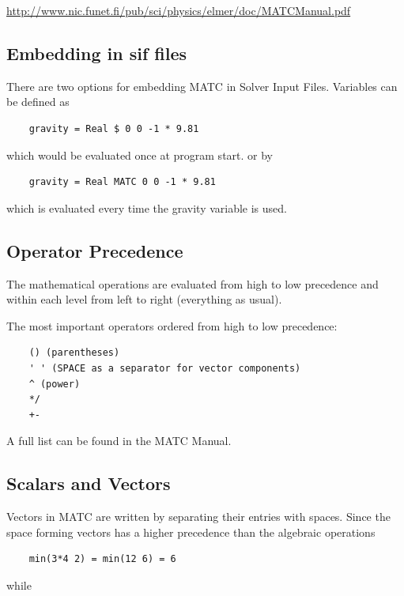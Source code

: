 \url{http://www.nic.funet.fi/pub/sci/physics/elmer/doc/MATCManual.pdf}

\subsection{Embedding in sif files}

There are two options for embedding MATC in Solver Input Files. Variables can be defined as

\begin{verbatim}
    gravity = Real $ 0 0 -1 * 9.81
\end{verbatim}

\noindent which would be evaluated once at program start. or by

\begin{verbatim}
    gravity = Real MATC 0 0 -1 * 9.81
\end{verbatim}

\noindent which is evaluated every time the gravity variable is used.

\subsection{Operator Precedence}

The mathematical operations are evaluated from high to low precedence and within each level from left to right (everything as usual).

\noindent The most important operators ordered from high to low precedence:

\begin{verbatim}
    () (parentheses)
    ' ' (SPACE as a separator for vector components)
    ^ (power)
    */ 
    +- 
\end{verbatim}

\noindent A full list can be found in the MATC Manual.

\subsection{Scalars and Vectors}

Vectors in MATC are written by separating their entries with spaces. Since the space forming vectors has a higher precedence than the algebraic operations

\begin{verbatim}
    min(3*4 2) = min(12 6) = 6
\end{verbatim}

\noindent while


